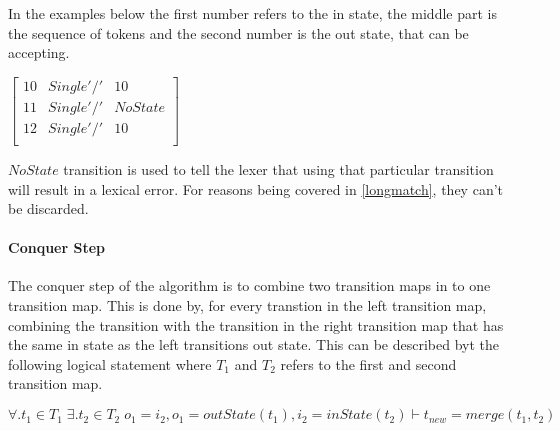 In the
examples below the first number refers to the in state, the middle part is the
sequence of tokens and the second number is the out state, that can be accepting.
\begin{center}
$\left[\begin{array}{ccc}
10&Single '/'&10\\
11&Single '/'&NoState\\
12&Single '/'&10\\
\end{array}\right]$
\end{center}
$NoState$ transition is used to tell the lexer that using that particular 
transition will result in a lexical error. For reasons being covered in
\cref{longmatch}, they can't be discarded.

\paragraph{Conquer Step}
The conquer step of the algorithm is to combine two transition maps in to one
transition map. This is done by, for every transtion in the left transition map, combining
the transition with the transition in the right transition map that has the same in state as the
left transitions out state. This can be described byt the following logical statement where $T_1$ and $T_2$ refers to the first and second transition map.
\begin{center}
$\forall.t_1\in T_1\;\exists.t_2\in T_2\;o_1=i_2,o_1=outState(t_1),i_2=inState(t_2)
\vdash t_{new}=merge(t_1,t_2)$
\end{center}

